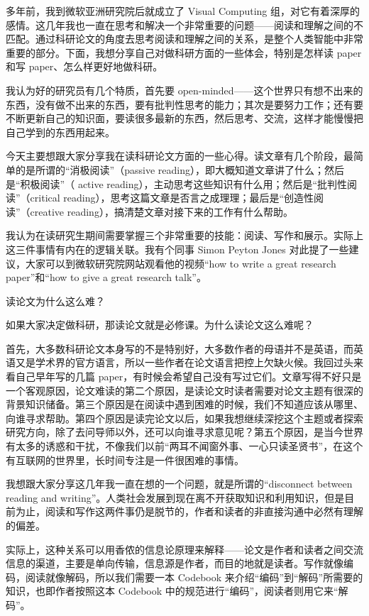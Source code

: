 多年前，我到微软亚洲研究院后就成立了 Visual Computing 组，对它有着深厚的感情。这几年我也一直在思考和解决一个非常重要的问题——阅读和理解之间的不匹配。通过科研论文的角度去思考阅读和理解之间的关系，是整个人类智能中非常重要的部分。下面，我想分享自己对做科研方面的一些体会，特别是怎样读 paper 和写 paper、怎么样更好地做科研。

我认为好的研究员有几个特质，首先要 open-minded——这个世界只有想不出来的东西，没有做不出来的东西，要有批判性思考的能力；其次是要努力工作；还有要不断更新自己的知识面，要读很多最新的东西，然后思考、交流，这样才能慢慢把自己学到的东西用起来。

今天主要想跟大家分享我在读科研论文方面的一些心得。读文章有几个阶段，最简单的是所谓的“消极阅读”（passive reading），即大概知道文章讲了什么；然后是“积极阅读”（ active reading），主动思考这些知识有什么用；然后是“批判性阅读”（critical reading），思考这篇文章是否言之成理理；最后是“创造性阅读”（creative reading），搞清楚文章对接下来的工作有什么帮助。



我认为在读研究生期间需要掌握三个非常重要的技能：阅读、写作和展示。实际上这三件事情有内在的逻辑关联。我有个同事 Simon Peyton Jones 对此提了一些建议，大家可以到微软研究院网站观看他的视频“how to write a great research paper”和“how to give a great research talk”。


读论文为什么这么难？



如果大家决定做科研，那读论文就是必修课。为什么读论文这么难呢？


首先，大多数科研论文本身写的不是特别好，大多数作者的母语并不是英语，而英语又是学术界的官方语言，所以一些作者在论文语言把控上欠缺火候。我回过头来看自己早年写的几篇 paper，有时候会希望自己没有写过它们。文章写得不好只是一个客观原因，论文难读的第二个原因，是读论文时读者需要对论文主题有很深的背景知识储备。第三个原因是在阅读中遇到困难的时候，我们不知道应该从哪里、向谁寻求帮助。第四个原因是读完论文以后，如果我想继续深挖这个主题或者探索研究方向，除了去问导师以外，还可以向谁寻求意见呢？第五个原因，是当今世界有太多的诱惑和干扰，不像我们以前“两耳不闻窗外事、一心只读圣贤书”，在这个有互联网的世界里，长时间专注是一件很困难的事情。



我想跟大家分享这几年我一直在想的一个问题，就是所谓的“disconnect between reading and writing”。人类社会发展到现在离不开获取知识和利用知识，但是目前为止，阅读和写作这两件事仍是脱节的，作者和读者的非直接沟通中必然有理解的偏差。



实际上，这种关系可以用香侬的信息论原理来解释——论文是作者和读者之间交流信息的渠道，主要是单向传输，信息源是作者，而目的地就是读者。写作就像编码，阅读就像解码，所以我们需要一本 Codebook 来介绍“编码”到“解码”所需要的知识，也即作者按照这本 Codebook 中的规范进行“编码”，阅读者则用它来“解码”。

